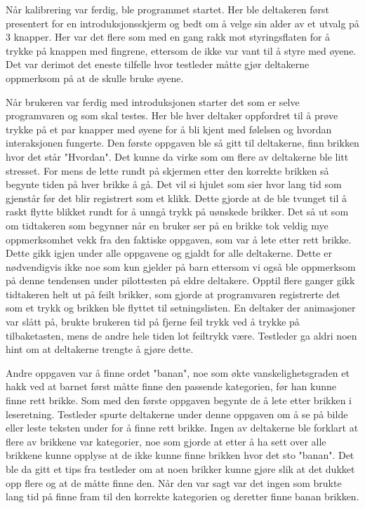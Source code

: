 Når kalibrering var ferdig, ble programmet startet. Her ble deltakeren først presentert for en introduksjonsskjerm og bedt om å velge sin alder av et utvalg på 3 knapper. Her var det flere som med en gang rakk mot styringsflaten for å trykke på knappen med fingrene, ettersom de ikke var vant til å styre med øyene. Det var derimot det eneste tilfelle hvor testleder måtte gjør deltakerne oppmerksom på at de skulle bruke øyene. 
 
Når brukeren var ferdig med introduksjonen starter det som er selve programvaren og som skal testes. Her ble hver deltaker oppfordret til  å prøve trykke på et par knapper med øyene for å bli kjent med følelsen og hvordan interaksjonen fungerte. Den første oppgaven ble så gitt til deltakerne, finn brikken hvor det står "Hvordan". Det kunne da virke som om flere av deltakerne ble litt stresset. For mens de lette rundt på skjermen etter den korrekte brikken så begynte tiden på hver brikke å gå. Det vil si hjulet som sier hvor lang tid som gjenstår før det blir registrert som et klikk. Dette gjorde at de ble tvunget til å raskt flytte blikket rundt for å unngå trykk på uønskede brikker. Det så ut som om tidtakeren som begynner når en bruker ser på en brikke tok veldig mye oppmerksomhet vekk fra den faktiske oppgaven, som var å lete etter rett brikke. Dette gikk igjen under alle oppgavene og gjaldt for alle deltakerne. Dette er nødvendigvis ikke noe som kun gjelder på barn ettersom vi også ble oppmerksom på denne tendensen under pilottesten på eldre deltakere. Opptil flere ganger gikk tidtakeren helt ut på feilt brikker, som gjorde at programvaren registrerte det som et trykk og brikken ble flyttet til setningslisten. En deltaker  der animasjoner var slått på, brukte brukeren tid på fjerne feil trykk ved å trykke på tilbaketasten, mens de andre hele tiden lot feiltrykk være. Testleder ga aldri noen hint om at deltakerne trengte å gjøre dette.  
 
 
Andre oppgaven var å finne ordet "banan", noe som økte vanskelighetsgraden et hakk ved at barnet først måtte finne den passende kategorien, før han kunne finne rett brikke. Som med den første oppgaven begynte de å lete etter brikken i leseretning. Testleder spurte deltakerne under denne oppgaven om å se på bilde eller leste teksten under for å finne rett brikke. Ingen av deltakerne ble forklart at flere av brikkene var kategorier, noe som gjorde at etter å ha sett over alle brikkene kunne opplyse at de ikke kunne finne brikken hvor det sto "banan". Det ble da gitt et tips fra testleder om at noen brikker kunne gjøre slik at det dukket opp flere og at de måtte finne den. Når den var sagt var det ingen som brukte lang tid på finne fram til den korrekte kategorien og deretter finne banan brikken.  
 

